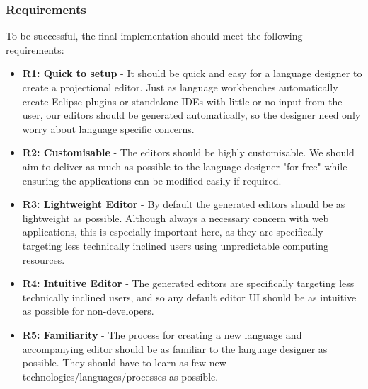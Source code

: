 \documentclass{article}
\begin{document}
\subsubsection{Requirements}\label{requirements}
To be successful, the final implementation should meet the following requirements: 

\begin{itemize}
\item \textbf{R1: Quick to setup} - It should be quick and easy for a language designer to create a projectional editor. Just as language workbenches automatically create Eclipse plugins or standalone IDEs with little or no input from the user, our editors should be generated automatically, so the designer need only worry about language specific concerns.
\item \textbf{R2: Customisable} - The editors should be highly customisable. We should aim to deliver as much as possible to the language designer "for free" while ensuring the applications can be modified easily if required. 
\item \textbf{R3: Lightweight Editor} - By default the generated editors should be as lightweight as possible. Although always a necessary concern with web applications, this is especially important here, as they are specifically targeting less technically inclined users using unpredictable computing resources.
\item \textbf{R4: Intuitive Editor} - The generated editors are specifically targeting less technically inclined users, and so any default editor UI should be as intuitive as possible for non-developers.
\item \textbf{R5: Familiarity} - The process for creating a new language and accompanying editor should be as familiar to the language designer as possible. They should have to learn as few new technologies/languages/processes as possible.
\end{itemize}
\end{document}
